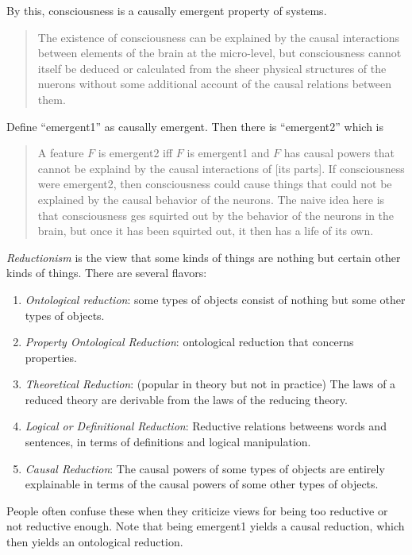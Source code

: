 \documentclass{article}
\newcommand{\ti}[1]{\textit{#1}}
\begin{document}
By this, consciousness is a causally emergent property of systems.
\begin{quote}
The existence of consciousness can be explained by the causal interactions between elements of the brain at the micro-level, but consciousness cannot itself be deduced or calculated from the sheer physical structures of the nuerons without some additional account of the causal relations between them.
\end{quote}

Define ``emergent1'' as causally emergent. Then there is ``emergent2'' which is

\begin{quote}
A feature $F$ is emergent2 iff $F$ is emergent1 and $F$ has causal powers that cannot be explaind by the causal interactions of [its parts]. If consciousness were emergent2, then consciousness could cause things that could not be explained by the causal behavior of the neurons. The naive idea here is that consciousness ges squirted out by the behavior of the neurons in the brain, but once it has been squirted out, it then has a life of its own.
\end{quote}

\ti{Reductionism} is the view that some kinds of things are nothing but certain other kinds of things. There are several flavors:
\begin{enumerate}
    \item \ti{Ontological reduction}: some types of objects consist of nothing but some other types of objects.
    \item \ti{Property Ontological Reduction}: ontological reduction that concerns properties.
    \item \ti{Theoretical Reduction}: (popular in theory but not in practice) The laws of a reduced theory are derivable from the laws of the reducing theory.
    \item \ti{Logical or Definitional Reduction}: Reductive relations betweens words and sentences, in terms of definitions and logical manipulation.
    \item \ti{Causal Reduction}: The causal powers of some types of objects are entirely explainable in terms of the causal powers of some other types of objects.
\end{enumerate}

People often confuse these when they criticize views for being too reductive or not reductive enough. Note that being emergent1 yields a causal reduction, which then yields an ontological reduction.
\end{document}
